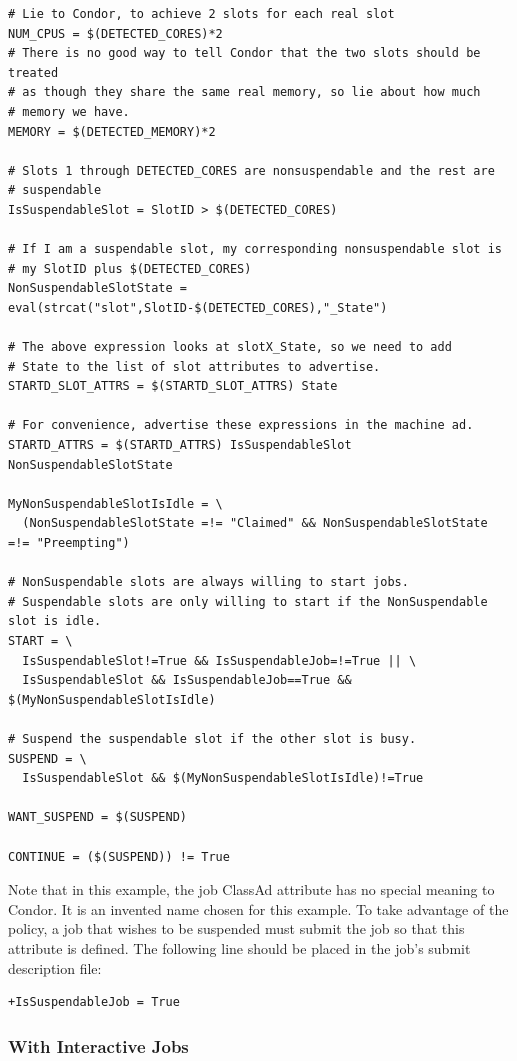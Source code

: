 \footnotesize
\begin{verbatim}
# Lie to Condor, to achieve 2 slots for each real slot
NUM_CPUS = $(DETECTED_CORES)*2
# There is no good way to tell Condor that the two slots should be treated
# as though they share the same real memory, so lie about how much
# memory we have.
MEMORY = $(DETECTED_MEMORY)*2

# Slots 1 through DETECTED_CORES are nonsuspendable and the rest are
# suspendable
IsSuspendableSlot = SlotID > $(DETECTED_CORES)

# If I am a suspendable slot, my corresponding nonsuspendable slot is
# my SlotID plus $(DETECTED_CORES)
NonSuspendableSlotState = eval(strcat("slot",SlotID-$(DETECTED_CORES),"_State")

# The above expression looks at slotX_State, so we need to add
# State to the list of slot attributes to advertise.
STARTD_SLOT_ATTRS = $(STARTD_SLOT_ATTRS) State

# For convenience, advertise these expressions in the machine ad.
STARTD_ATTRS = $(STARTD_ATTRS) IsSuspendableSlot NonSuspendableSlotState

MyNonSuspendableSlotIsIdle = \
  (NonSuspendableSlotState =!= "Claimed" && NonSuspendableSlotState =!= "Preempting")

# NonSuspendable slots are always willing to start jobs.
# Suspendable slots are only willing to start if the NonSuspendable slot is idle.
START = \
  IsSuspendableSlot!=True && IsSuspendableJob=!=True || \
  IsSuspendableSlot && IsSuspendableJob==True && $(MyNonSuspendableSlotIsIdle)

# Suspend the suspendable slot if the other slot is busy.
SUSPEND = \
  IsSuspendableSlot && $(MyNonSuspendableSlotIsIdle)!=True

WANT_SUSPEND = $(SUSPEND)

CONTINUE = ($(SUSPEND)) != True

\end{verbatim}
\normalsize

Note that in this example, the job ClassAd attribute 
has no special meaning to Condor.  It is an invented name chosen
for this example.
To take advantage of the policy, a job that wishes to be suspended
must submit the job so that this attribute is defined.
The following line should be placed in the job's submit description file:
\begin{verbatim}
+IsSuspendableJob = True
\end{verbatim}

\subsubsection{\label{sec:Interactive-Job-Policy}With Interactive Jobs}
\Todo
